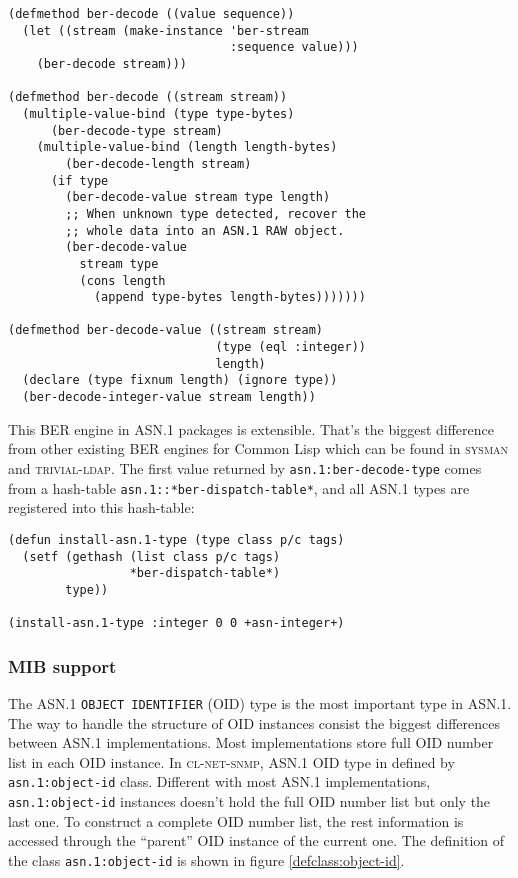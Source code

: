 \documentclass[reprint,9pt]{sigplanconf}
\begin{document}
\begin{verbatim}
(defmethod ber-decode ((value sequence))
  (let ((stream (make-instance 'ber-stream
                               :sequence value)))
    (ber-decode stream)))

(defmethod ber-decode ((stream stream))
  (multiple-value-bind (type type-bytes)
      (ber-decode-type stream)
    (multiple-value-bind (length length-bytes)
        (ber-decode-length stream)
      (if type
        (ber-decode-value stream type length)
        ;; When unknown type detected, recover the
        ;; whole data into an ASN.1 RAW object.
        (ber-decode-value
          stream type
          (cons length
            (append type-bytes length-bytes)))))))

(defmethod ber-decode-value ((stream stream)
                             (type (eql :integer))
                             length)
  (declare (type fixnum length) (ignore type))
  (ber-decode-integer-value stream length))
\end{verbatim}

This BER engine in ASN.1 packages is extensible. That's the biggest
difference from other existing BER engines for Common Lisp which can be
found in \textsc{sysman} and \textsc{trivial-ldap}.  The first
value returned by \texttt{asn.1:ber-decode-type} comes from a
hash-table \texttt{asn.1::*ber-dispatch-table*}, and all ASN.1 types
are registered into this hash-table:

\begin{verbatim}
(defun install-asn.1-type (type class p/c tags)
  (setf (gethash (list class p/c tags)
                 *ber-dispatch-table*)
        type))

(install-asn.1-type :integer 0 0 +asn-integer+)
\end{verbatim}

\subsubsection{MIB support}

The ASN.1 \texttt{OBJECT IDENTIFIER} (OID) type is the most important
type in ASN.1.
The way to handle the structure of OID instances
consist the biggest differences between ASN.1 implementations.
Most implementations store full OID number list in each OID
instance.
In \textsc{cl-net-snmp}, ASN.1 OID type in defined by
\texttt{asn.1:object-id} class. Different with most ASN.1 implementations,
\texttt{asn.1:object-id} instances doesn't hold the full OID number list
but only the last one. To construct
a complete OID number list, the rest information is accessed through
the ``parent'' OID instance of the current one. The definition of the
class \texttt{asn.1:object-id} is shown in figure \ref{defclass:object-id}.
\end{document}
